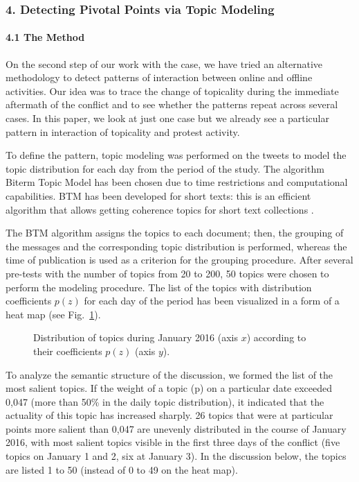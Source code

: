 \subsubsection{4. Detecting Pivotal Points via Topic Modeling}

\paragraph{4.1 The Method}
On the second step of our work with the case, we have tried an alternative methodology to detect patterns of interaction between online and offline activities. Our idea was to trace the change of topicality during the immediate aftermath of the conflict and to see whether the patterns repeat across several cases. In this paper, we look at just one case but we already see a particular pattern in interaction of topicality and protest activity.

To define the pattern, topic modeling was performed on the tweets to model the topic distribution for each day from the period of the study. The algorithm Biterm Topic Model has been chosen due to time restrictions and computational capabilities. BTM has been developed for short texts: this is an efficient algorithm that allows getting coherence topics for short text collections \cite{YanyanJiafengXueqi}.

The BTM algorithm assigns the topics to each document; then, the grouping of the messages and the corresponding topic distribution is performed, whereas the time of publication is used as a criterion for the grouping procedure. After several pre-tests with the number of topics from 20 to 200, 50 topics were chosen to perform the modeling procedure. The list of the topics with distribution coefficients \(p(z)\) for each day of the period has been visualized in a form of a heat map (see Fig.~\cref{fig:topicDistributionJan2016}).

\begin{figure}[ht]
	\caption{Distribution of topics during January 2016 (axis \(x\)) according to their coefficients \(p(z)\) (axis \(y\)).}\label{fig:topicDistributionJan2016}
\end{figure}

To analyze the semantic structure of the discussion, we formed the list of the most salient topics. If the weight of a topic (p) on a particular date exceeded 0,047 (more than 50\% in the daily topic distribution), it indicated that the actuality of this topic has increased sharply. 26 topics that were at particular points more salient than 0,047 are unevenly distributed in the course of January 2016, with most salient topics visible in the first three days of the conflict (five topics on January 1 and 2, six at January 3). In the discussion below, the topics are listed 1 to 50 (instead of 0 to 49 on the heat map).

